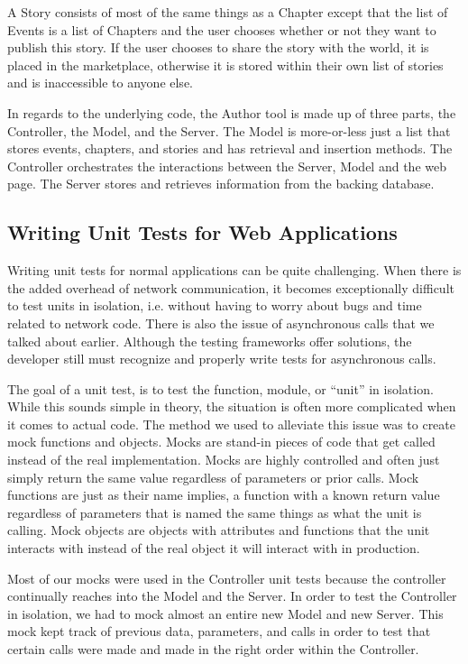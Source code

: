 \documentclass[12pt]{ucthesis}
\begin{document}
A Story consists of most of the same things as a Chapter except that the list of Events is a list of Chapters and the user chooses whether or not they want to publish this story. If the user chooses to share the story with the world, it is placed in the marketplace, otherwise it is stored within their own list of stories and is inaccessible to anyone else.

In regards to the underlying code, the Author tool is made up of three parts, the Controller, the Model, and the Server. The Model is more-or-less just a list that stores events, chapters, and stories and has retrieval and insertion methods. The Controller orchestrates the interactions between the Server, Model and the web page. The Server stores and retrieves information from the backing database.

\subsection{Writing Unit Tests for Web Applications}
Writing unit tests for normal applications can be quite challenging. When there is the added overhead of network communication, it becomes exceptionally difficult to test units in isolation, i.e. without having to worry about bugs and time related to network code. There is also the issue of asynchronous calls that we talked about earlier. Although the testing frameworks offer solutions, the developer still must recognize and properly write tests for asynchronous calls.

The goal of a unit test, is to test the function, module, or ``unit'' in isolation. While this sounds simple in theory, the situation is often more complicated when it comes to actual code. The method we used to alleviate this issue was to create mock functions and objects. Mocks are stand-in pieces of code that get called instead of the real implementation. Mocks are highly controlled and often just simply return the same value regardless of parameters or prior calls. Mock functions are just as their name implies, a function with a known return value regardless of parameters that is named the same things as what the unit is calling. Mock objects are objects with attributes and functions that the unit interacts with instead of the real object it will interact with in production.

Most of our mocks were used in the Controller unit tests because the controller continually reaches into the Model and the Server. In order to test the Controller in isolation, we had to mock almost an entire new Model and new Server. This mock kept track of previous data, parameters, and calls in order to test that certain calls were made and made in the right order within the Controller.
\end{document}
